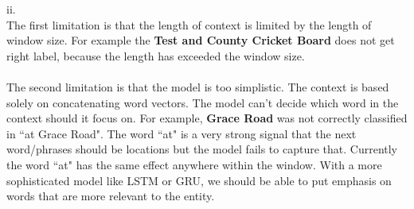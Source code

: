 \documentclass[10pt]{article}
\begin{document}
\begin{enumerate}[label=(\alph*)]
ii.\\
The first limitation is that the length of context is limited by the length of window size.
For example the \textbf{Test and County Cricket Board} does not get right label, because the length has exceeded the window size.\\
\\
The second limitation is that the model is too simplistic. The context is based solely on concatenating word vectors. The model can't decide which word in the context should it focus on. For example, \textbf{Grace Road} was not correctly classified in ``at Grace Road". The word ``at" is a very strong signal that the next word/phrases should be locations but the model fails to capture that. Currently the word ``at" has the same effect anywhere within the window. With a more sophisticated model like LSTM or GRU, we should be able to put emphasis on words that are more relevant to the entity. 

\end{enumerate}
\clearpage
\end{document}
